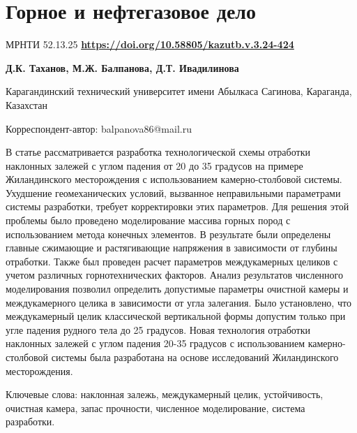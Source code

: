 \newpage
\let\cleardoublepage\clearpage
\chapter{Горное и нефтегазовое дело}
МРНТИ 52.13.25
\hfill {\bfseries \href{https://doi.org/10.58805/kazutb.v.3.24-424}{https://doi.org/10.58805/kazutb.v.3.24-424}}


\begin{center}
{\bfseries Д.К. Таханов, М.Ж. Балпанова\envelope, Д.Т. Ивадилинова}

Карагандинский технический университет имени Абылкаса
Сагинова, Караганда, Казахстан
\end{center}
\envelope Корреспондент-автор: balpanova86@mail.ru


В статье рассматривается разработка технологической схемы отработки
наклонных залежей с углом падения от 20 до 35 градусов на примере
Жиландинского месторождения с использованием камерно-столбовой системы.
Ухудшение геомеханических условий, вызванное неправильными параметрами
системы разработки, требует корректировки этих параметров. Для решения
этой проблемы было проведено моделирование массива горных пород с
использованием метода конечных элементов. В результате были определены
главные сжимающие и растягивающие напряжения в зависимости от глубины
отработки. Также был проведен расчет параметров междукамерных целиков с
учетом различных горнотехнических факторов. Анализ результатов
численного моделирования позволил определить допустимые параметры
очистной камеры и междукамерного целика в зависимости от угла залегания.
Было установлено, что междукамерный целик классической вертикальной
формы допустим только при угле падения рудного тела до 25 градусов.
Новая технология отработки наклонных залежей с углом падения 20-35
градусов с использованием камерно-столбовой системы была разработана на
основе исследований Жиландинского месторождения.

Ключевые слова: наклонная залежь, междукамерный целик, устойчивость,
очистная камера, запас прочности, численное моделирование, система
разработки.


